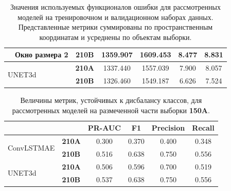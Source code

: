 \documentclass{article}
\begin{document}
\begin{table}[]
\begin{tabular}{lc|c||cc|cc|}
    \multicolumn{1}{|l|}{}                            & Окно размера 2                  & \textbf{210B}                                                                         & \multicolumn{1}{|c|}{1359.907} & 1609.453 & \multicolumn{1}{c|}{8.477} & 8.831 \\ \hline
    \multicolumn{2}{|l|}{\multirow{2}{*}{UNET3d}}                                       & \textbf{210A}                                                                         & \multicolumn{1}{|c|}{1337.440} & 1557.039 & \multicolumn{1}{c|}{7.900} & 8.057 \\ \cline{3-7} 
    \multicolumn{2}{|l|}{}                                                              & \textbf{210B}                                                                         & \multicolumn{1}{|c|}{1326.460} & 1549.187 & \multicolumn{1}{c|}{6.626} & 7.524 \\ \hline
    \end{tabular}
    \caption{Значения используемых функционалов ошибки для рассмотренных моделей на тренировочном и валидационном наборах данных. Представленные метрики суммированы по пространственным координатам и усреднены по объектам выборки.}
    \label{tab:comp_metrics}
    \end{table}

    \begin{table}[]
    \centering
    \begin{tabular}{ll||c|c|c|c|}
    \cline{3-6}
    \multicolumn{2}{l|}{}                                             & PR-AUC & F1    & Precision & Recall \\ \hline\hline
    \multicolumn{1}{|l|}{\multirow{2}{*}{ConvLSTMAE}} & \textbf{210A} & 0.300  & 0.370 & 0.400     & 0.348  \\ \cline{2-6} 
    \multicolumn{1}{|l|}{}                            & \textbf{210B} & 0.516  & 0.638 & 0.750     & 0.556  \\ \hline
    \multicolumn{1}{|l|}{\multirow{2}{*}{UNET3d}}     & \textbf{210A} & 0.506  & 0.596 & 0.700     & 0.519  \\ \cline{2-6} 
    \multicolumn{1}{|l|}{}                            & \textbf{210B} & 0.537  & 0.638 & 0.750     & 0.556  \\ \hline
    \end{tabular}
    \caption{Величины метрик, устойчивых к дисбалансу классов, для рассмотренных моделей на размеченной части выборки \textbf{150A}.}
    \label{tab:sup_metrics}
    \end{table}
\end{document}
